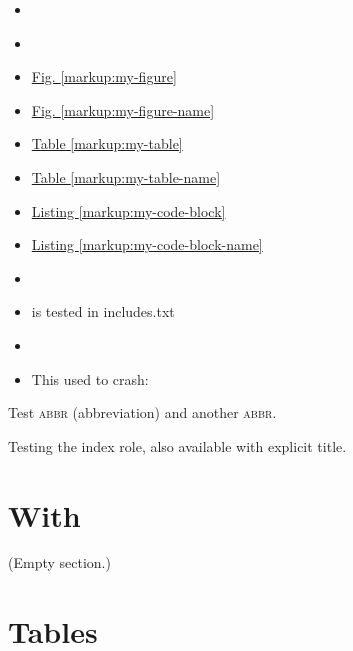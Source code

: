 \documentclass[letterpaper,10pt,english]{sphinxmanual}
\begin{document}
\begin{itemize}
\item {} 
{\hyperref[markup:my\string-code\string-block]{}}

\item {} 
{\hyperref[markup:my\string-code\string-block\string-name]{}}

\item {} 
\hyperref[markup:my-figure]{Fig. \ref{markup:my-figure}}

\item {} 
\hyperref[markup:my-figure-name]{Fig. \ref{markup:my-figure-name}}

\item {} 
\hyperref[markup:my-table]{Table \ref{markup:my-table}}

\item {} 
\hyperref[markup:my-table-name]{Table \ref{markup:my-table-name}}

\item {} 
\hyperref[markup:my-code-block]{Listing \ref{markup:my-code-block}}

\item {} 
\hyperref[markup:my-code-block-name]{Listing \ref{markup:my-code-block-name}}

\item {} 
{\hyperref[subdir/includes::doc]{}}

\item {} 
 is tested in includes.txt

\item {} 
{\hyperref[objects:cmdoption\string-python\string-c]{}}

\item {} 
This used to crash: 

\end{itemize}

Test \textsc{abbr} (abbreviation) and another \textsc{abbr}.

Testing the index role, also available with
explicit title.


\section{With}
\label{markup:with}\label{markup:id1}
(Empty section.)


\section{Tables}
\label{markup:tables}
\end{document}
